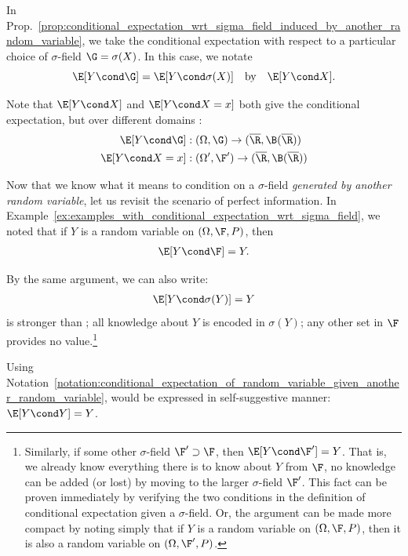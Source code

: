 \documentclass{article} %
\begin{document}
\begin{notation}
In Prop.~\ref{prop:conditional_expectation_wrt_sigma_field_induced_by_another_random_variable}, we take the conditional expectation with respect to a particular choice of $\sigma$-field $\G = \sigma(X)$.  In this case, we notate
\[ \E[Y \cond \G] = \E[Y \cond \sigma(X)]  \quad \text{by} \quad \E[Y \cond X].\]

Note that $\E[Y \cond X]$ and $\E[Y \cond X=x]$ both give the conditional expectation, but over different domains :
\begin{align*}
\E[Y \cond \G] &: (\Omega, \G) \to (\overline{\R}, \B(\overline{\R})) 	 \\
\E[Y \cond X = x] &: (\Omega', \F') \to (\overline{\R}, \B(\overline{\R}))
\end{align*}
\label{notation:conditional_expectation_of_random_variable_given_another_random_variable}
\end{notation}


\begin{remark}
Now that we know what it means to condition on a $\sigma$-field \textit{generated by another random variable}, let us revisit the scenario of perfect information. In  Example~\ref{ex:examples_with_conditional_expectation_wrt_sigma_field},  we noted that if $Y$ is a random variable on $(\Omega, \F, P)$, then	
\begin{align}
\E[Y \cond \F] = Y.
\label{eqn:perfect_information_again}	
\end{align}
  
By the same argument, we can also write: 
\begin{align}
\E[Y \cond \sigma(Y)] = Y
\label{eqn:perfect_information_a_stronger_statement}	
\end{align}
	is stronger than ; all knowledge about $Y$ is encoded in $\sigma(Y)$; any other set in $\F$ provides no value.\footnote{Similarly, if some other $\sigma$-field $\F' \supset \F$, then $\E[Y \cond \F'] = Y$.  That is, we already know everything there is to know about $Y$ from $\F$, no knowledge can be added (or lost) by moving to the larger $\sigma$-field $\F'$.  This fact can be proven immediately by verifying the two conditions in the definition of conditional expectation given a $\sigma$-field.  Or, the argument can be made more compact by noting simply that if $Y$ is a random variable on $(\Omega, \F, P)$, then it is also a random variable on $(\Omega, \F', P)$.} 

Using Notation~\ref{notation:conditional_expectation_of_random_variable_given_another_random_variable},  would be expressed in self-suggestive manner: $\E[Y \cond Y] = Y$.
\end{remark}
\end{document}
